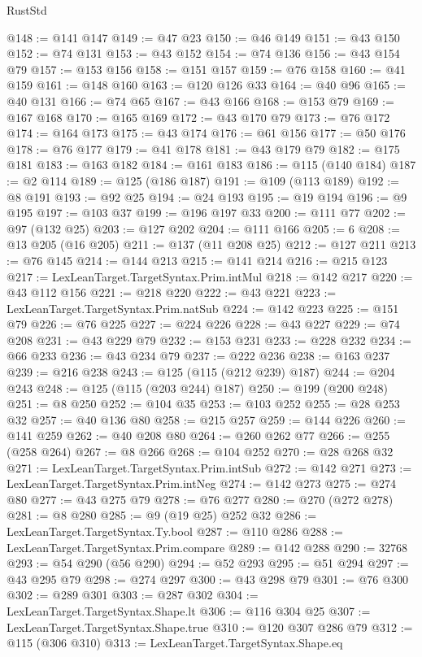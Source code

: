 \begin{lexlean}{RustStd}
\begin{coremodule}
@148 := @141 @147
@149 := @47 @23
@150 := @46 @149
@151 := @43 @150
@152 := @74 @131
@153 := @43 @152
@154 := @74 @136
@156 := @43 @154 @79
@157 := @153 @156
@158 := @151 @157
@159 := @76 @158
@160 := @41 @159
@161 := @148 @160
@163 := @120 @126 @33
@164 := @40 @96
@165 := @40 @131
@166 := @74 @65
@167 := @43 @166
@168 := @153 @79
@169 := @167 @168
@170 := @165 @169
@172 := @43 @170 @79
@173 := @76 @172
@174 := @164 @173
@175 := @43 @174
@176 := @61 @156
@177 := @50 @176
@178 := @76 @177
@179 := @41 @178
@181 := @43 @179 @79
@182 := @175 @181
@183 := @163 @182
@184 := @161 @183
@186 := @115 (@140 @184)
@187 := @2 @114
@189 := @125 (@186 @187)
@191 := @109 (@113 @189)
@192 := @8 @191
@193 := @92 @25
@194 := @24 @193
@195 := @19 @194
@196 := @9 @195
@197 := @103 @37
@199 := @196 @197 @33
@200 := @111 @77
@202 := @97 (@132 @25)
@203 := @127 @202
@204 := @111 @166
@205 := 6
@208 := @13 @205 (@16 @205)
@211 := @137 (@11 @208 @25)
@212 := @127 @211
@213 := @76 @145
@214 := @144 @213
@215 := @141 @214
@216 := @215 @123
@217 := LexLeanTarget.TargetSyntax.Prim.intMul
@218 := @142 @217
@220 := @43 @112 @156
@221 := @218 @220
@222 := @43 @221
@223 := LexLeanTarget.TargetSyntax.Prim.natSub
@224 := @142 @223
@225 := @151 @79
@226 := @76 @225
@227 := @224 @226
@228 := @43 @227
@229 := @74 @208
@231 := @43 @229 @79
@232 := @153 @231
@233 := @228 @232
@234 := @66 @233
@236 := @43 @234 @79
@237 := @222 @236
@238 := @163 @237
@239 := @216 @238
@243 := @125 (@115 (@212 @239) @187)
@244 := @204 @243
@248 := @125 (@115 (@203 @244) @187)
@250 := @199 (@200 @248)
@251 := @8 @250
@252 := @104 @35
@253 := @103 @252
@255 := @28 @253 @32
@257 := @40 @136 @80
@258 := @215 @257
@259 := @144 @226
@260 := @141 @259
@262 := @40 @208 @80
@264 := @260 @262 @77
@266 := @255 (@258 @264)
@267 := @8 @266
@268 := @104 @252
@270 := @28 @268 @32
@271 := LexLeanTarget.TargetSyntax.Prim.intSub
@272 := @142 @271
@273 := LexLeanTarget.TargetSyntax.Prim.intNeg
@274 := @142 @273
@275 := @274 @80
@277 := @43 @275 @79
@278 := @76 @277
@280 := @270 (@272 @278)
@281 := @8 @280
@285 := @9 (@19 @25) @252 @32
@286 := LexLeanTarget.TargetSyntax.Ty.bool
@287 := @110 @286
@288 := LexLeanTarget.TargetSyntax.Prim.compare
@289 := @142 @288
@290 := 32768
@293 := @54 @290 (@56 @290)
@294 := @52 @293
@295 := @51 @294
@297 := @43 @295 @79
@298 := @274 @297
@300 := @43 @298 @79
@301 := @76 @300
@302 := @289 @301
@303 := @287 @302
@304 := LexLeanTarget.TargetSyntax.Shape.lt
@306 := @116 @304 @25
@307 := LexLeanTarget.TargetSyntax.Shape.true
@310 := @120 @307 @286 @79
@312 := @115 (@306 @310)
@313 := LexLeanTarget.TargetSyntax.Shape.eq

\end{coremodule}
\end{lexlean}
